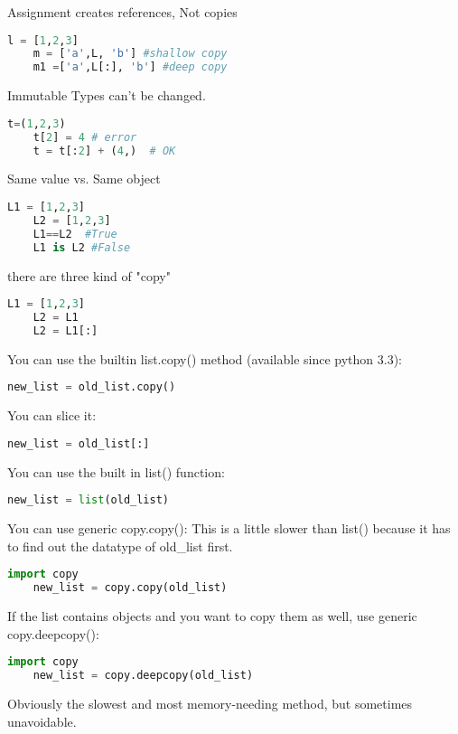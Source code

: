 \documentclass[a4paper,12pt,twoside]{book}
\begin{document}
Assignment creates references, Not copies
\begin{lstlisting}[frame=single, language=Python]
	l = [1,2,3]
	m = ['a',L, 'b'] #shallow copy
	m1 =['a',L[:], 'b'] #deep copy
\end{lstlisting}  

Immutable Types can't be changed. 
\begin{lstlisting}[frame=single, language=Python]
	t=(1,2,3)
	t[2] = 4 # error
	t = t[:2] + (4,)  # OK
\end{lstlisting}  
Same value vs. Same object
\begin{lstlisting}[frame=single, language=Python]
	L1 = [1,2,3]
	L2 = [1,2,3]
	L1==L2  #True
	L1 is L2 #False
\end{lstlisting}  

there are three kind of "copy"
\begin{lstlisting}[frame=single, language=Python]
	L1 = [1,2,3]
	L2 = L1
	L2 = L1[:]
\end{lstlisting}  

You can use the builtin list.copy() method (available since python 3.3):
\begin{lstlisting}[frame=single, language=Python]
	new_list = old_list.copy()
\end{lstlisting}  
You can slice it:
\begin{lstlisting}[frame=single, language=Python]
	new_list = old_list[:]
\end{lstlisting}  
You can use the built in list() function:
\begin{lstlisting}[frame=single, language=Python]
	new_list = list(old_list)
\end{lstlisting}  
You can use generic copy.copy(): This is a little slower than list() because it has to find out the datatype of old\_list first.


\begin{lstlisting}[frame=single, language=Python]
	import copy
	new_list = copy.copy(old_list)
\end{lstlisting}  


If the list contains objects and you want to copy them as well, use generic copy.deepcopy():

\begin{lstlisting}[frame=single, language=Python]
	import copy
	new_list = copy.deepcopy(old_list)
\end{lstlisting}
Obviously the slowest and most memory-needing method, but sometimes unavoidable.
\end{document}
